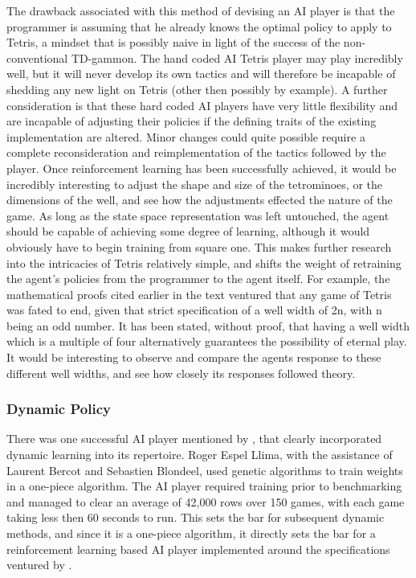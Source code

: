 \documentclass[a4paper]{article}%
\begin{document}
The drawback associated with this method of devising an AI player is that the programmer is assuming that he already knows the optimal policy to apply to Tetris, a mindset that is possibly naive in light of the success of the non-conventional TD-gammon. The hand coded AI Tetris player may play incredibly well, but it will never develop its own tactics and will therefore be incapable of shedding any new light on Tetris (other then possibly by example). A further consideration is that these hard coded AI players have very little flexibility and are incapable of adjusting their policies if the defining traits of the existing implementation are altered. Minor changes could quite possible require a complete reconsideration and reimplementation of the tactics followed by the player.
 Once reinforcement learning has been successfully achieved, it would be incredibly interesting to adjust the shape and size of the tetrominoes, or the dimensions of the well, and see how the adjustments effected the nature of the game. As long as the state space representation was left untouched, the agent should be capable of achieving some degree of learning, although it would obviously have to begin training from square one. This makes further research into the intricacies of Tetris relatively simple, and shifts the weight of retraining the agent's policies from the programmer to the agent itself. For example, the mathematical proofs cited earlier in the text ventured that any game of Tetris was fated to end, given that strict specification of a well width of 2n, with n being an odd number. It has been stated, without proof\citep{tetstand}, that having a well width which is a multiple of four alternatively guarantees the possibility of eternal play. It would be interesting to observe and compare the agents response to these different well widths, and see how closely its responses followed theory.  

\subsubsection{Dynamic Policy}

There was one successful AI player mentioned by \cite{tetstand}, that clearly incorporated dynamic learning into its repertoire. Roger Espel Llima, with the assistance of Laurent Bercot and Sebastien Blondeel, used genetic algorithms to train weights in a one-piece algorithm. The AI player\citep{gatetris} required training prior to benchmarking and managed to clear an average of 42,000 rows over 150 games, with each game taking less then 60 seconds to run. This sets the bar for subsequent dynamic methods, and since it is a one-piece algorithm, it directly sets the bar for a reinforcement learning based AI player implemented around the specifications ventured by \cite{tetstand}.
\end{document}
